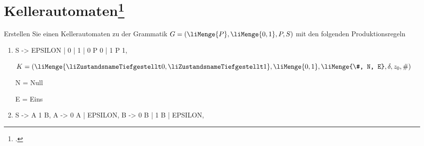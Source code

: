 \documentclass{lehramt-informatik-aufgabe}
\begin{document}
\let\m=\liMenge
\let\z=\liZustandsnameTiefgestellt


\section{Kellerautomaten\footcite[Seite 27]{theo:fs:2}}

Erstellen Sie einen Kellerautomaten zu der Grammatik $G = (\m{P} , \m{0,
1}, P, S)$ mit den folgenden Produktionsregeln

\begin{enumerate}

%

\item

\begin{liProduktionsRegeln}
S -> EPSILON | 0 | 1 | 0 P 0 | 1 P 1,
\end{liProduktionsRegeln}

\begin{liAntwort}
$K = (\m{\z0, \z1}, \m{0, 1}, \m{\#, N, E}, \delta, z_0, \#)$

N = Null

E = Eins

\begin{center}
\end{center}

\end{liAntwort}

%

\item

\begin{liProduktionsRegeln}
S -> A 1 B,
A -> 0 A | EPSILON,
B -> 0 B | 1 B | EPSILON,
\end{liProduktionsRegeln}
\end{enumerate}
\end{document}
